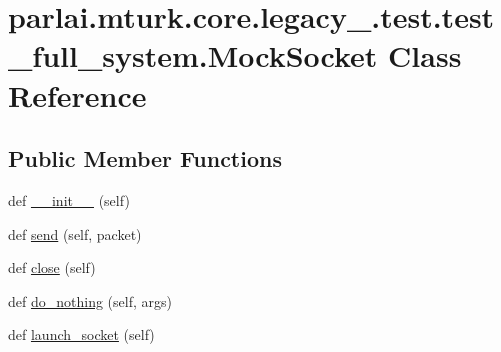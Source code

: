 \hypertarget{classparlai_1_1mturk_1_1core_1_1legacy__2018_1_1test_1_1test__full__system_1_1MockSocket}{}\section{parlai.\+mturk.\+core.\+legacy\+\_.\+test.\+test\+\_\+full\+\_\+system.\+Mock\+Socket Class Reference}
\label{classparlai_1_1mturk_1_1core_1_1legacy__2018_1_1test_1_1test__full__system_1_1MockSocket}
\subsection*{Public Member Functions}
\begin{DoxyCompactItemize}
\item 
def \hyperlink{classparlai_1_1mturk_1_1core_1_1legacy__2018_1_1test_1_1test__full__system_1_1MockSocket_a4d744098fe9a3e3efee2a09fbaae41e0}{\+\_\+\+\_\+init\+\_\+\+\_\+} (self)
\item 
def \hyperlink{classparlai_1_1mturk_1_1core_1_1legacy__2018_1_1test_1_1test__full__system_1_1MockSocket_abd0988fb013adc98c3ff1b4d1ed40402}{send} (self, packet)
\item 
def \hyperlink{classparlai_1_1mturk_1_1core_1_1legacy__2018_1_1test_1_1test__full__system_1_1MockSocket_ab385ddbacb3cd1f6315d4cd44e530c5a}{close} (self)
\item 
def \hyperlink{classparlai_1_1mturk_1_1core_1_1legacy__2018_1_1test_1_1test__full__system_1_1MockSocket_a8ee2cf3f33a582daace35f6ca8d9389a}{do\+\_\+nothing} (self, args)
\item 
def \hyperlink{classparlai_1_1mturk_1_1core_1_1legacy__2018_1_1test_1_1test__full__system_1_1MockSocket_aa112de240558ca7b11d5b5b61838b1eb}{launch\+\_\+socket} (self)
\end{DoxyCompactItemize}
